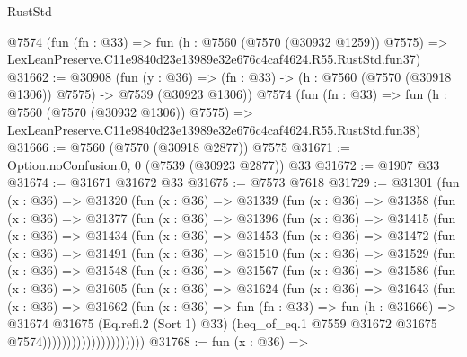 \begin{lexlean}{RustStd}
\begin{coremodule}
    @7574
    (fun (fn : @33) =>
    fun (h : @7560 (@7570 (@30932 @1259)) @7575) =>
    LexLeanPreserve.C11e9840d23e13989e32e676c4caf4624.R55.RustStd.fun37)
@31662 := @30908
    (fun (y : @36) =>
    (fn : @33) -> (h : @7560 (@7570 (@30918 @1306)) @7575) -> @7539 (@30923 @1306))
    @7574
    (fun (fn : @33) =>
    fun (h : @7560 (@7570 (@30932 @1306)) @7575) =>
    LexLeanPreserve.C11e9840d23e13989e32e676c4caf4624.R55.RustStd.fun38)
@31666 := @7560 (@7570 (@30918 @2877)) @7575
@31671 := Option.noConfusion.{0, 0} (@7539 (@30923 @2877)) @33
@31672 := @1907 @33
@31674 := @31671 @31672 @33
@31675 := @7573 @7618
@31729 := @31301
    (fun (x : @36) =>
    @31320
      (fun (x : @36) =>
      @31339
        (fun (x : @36) =>
        @31358
          (fun (x : @36) =>
          @31377
            (fun (x : @36) =>
            @31396
              (fun (x : @36) =>
              @31415
                (fun (x : @36) =>
                @31434
                  (fun (x : @36) =>
                  @31453
                    (fun (x : @36) =>
                    @31472
                      (fun (x : @36) =>
                      @31491
                        (fun (x : @36) =>
                        @31510
                          (fun (x : @36) =>
                          @31529
                            (fun (x : @36) =>
                            @31548
                              (fun (x : @36) =>
                              @31567
                                (fun (x : @36) =>
                                @31586
                                  (fun (x : @36) =>
                                  @31605
                                    (fun (x : @36) =>
                                    @31624
                                      (fun (x : @36) =>
                                      @31643
                                        (fun (x : @36) =>
                                        @31662
                                          (fun (x : @36) =>
                                          fun (fn : @33) =>
                                          fun (h : @31666) =>
                                          @31674
                                            @31675
                                            (Eq.refl.{2} (Sort 1) @33)
                                            (heq_of_eq.{1}
                                              @7559
                                              @31672
                                              @31675
                                              @7574)))))))))))))))))))))
@31768 := fun (x : @36) =>

\end{coremodule}
\end{lexlean}

